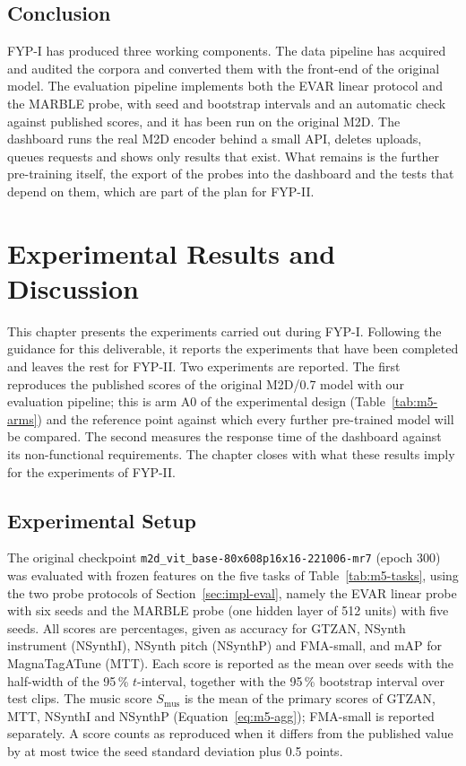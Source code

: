 \section{Conclusion}
\label{sec:impl-conclusion}
FYP-I has produced three working components. The data pipeline has acquired and audited the corpora and converted them with the front-end of the original model. The evaluation pipeline implements both the EVAR linear protocol and the MARBLE probe, with seed and bootstrap intervals and an automatic check against published scores, and it has been run on the original M2D. The dashboard runs the real M2D encoder behind a small API, deletes uploads, queues requests and shows only results that exist. What remains is the further pre-training itself, the export of the probes into the dashboard and the tests that depend on them, which are part of the plan for FYP-II.

\chapter{Experimental Results and Discussion}
\label{ch:results}
This chapter presents the experiments carried out during FYP-I. Following the guidance for this deliverable, it reports the experiments that have been completed and leaves the rest for FYP-II. Two experiments are reported. The first reproduces the published scores of the original M2D/0.7 model with our evaluation pipeline; this is arm A0 of the experimental design (Table~\ref{tab:m5-arms}) and the reference point against which every further pre-trained model will be compared. The second measures the response time of the dashboard against its non-functional requirements. The chapter closes with what these results imply for the experiments of FYP-II.

\section{Experimental Setup}
\label{sec:res-setup}
The original checkpoint \texttt{m2d\_vit\_base-80x608p16x16-221006-mr7} (epoch 300) was evaluated with frozen features on the five tasks of Table~\ref{tab:m5-tasks}, using the two probe protocols of Section~\ref{sec:impl-eval}, namely the EVAR linear probe with six seeds and the MARBLE probe (one hidden layer of 512 units) with five seeds. All scores are percentages, given as accuracy for GTZAN, NSynth instrument (NSynthI), NSynth pitch (NSynthP) and FMA-small, and mAP for MagnaTagATune (MTT). Each score is reported as the mean over seeds with the half-width of the 95\,\% $t$-interval, together with the 95\,\% bootstrap interval over test clips. The music score $S_{\mathrm{mus}}$ is the mean of the primary scores of GTZAN, MTT, NSynthI and NSynthP (Equation~\ref{eq:m5-agg}); FMA-small is reported separately. A score counts as reproduced when it differs from the published value by at most twice the seed standard deviation plus 0.5 points.

